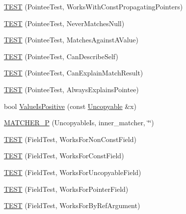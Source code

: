 \begin{DoxyCompactItemize}
\item 
\mbox{\hyperlink{namespacetesting_1_1gmock__matchers__test_a9d851a5bb597fa45b5d1cf3f295398e8}{T\+E\+ST}} (Pointee\+Test, Works\+With\+Const\+Propagating\+Pointers)
\item 
\mbox{\hyperlink{namespacetesting_1_1gmock__matchers__test_ac778a9cebf9306a5efd27cc1186d8269}{T\+E\+ST}} (Pointee\+Test, Never\+Matches\+Null)
\item 
\mbox{\hyperlink{namespacetesting_1_1gmock__matchers__test_afe22e8230dc7a34498e4b2f91dcdd7cd}{T\+E\+ST}} (Pointee\+Test, Matches\+Against\+A\+Value)
\item 
\mbox{\hyperlink{namespacetesting_1_1gmock__matchers__test_ac8b9baa938635d587f0b0df1073208e2}{T\+E\+ST}} (Pointee\+Test, Can\+Describe\+Self)
\item 
\mbox{\hyperlink{namespacetesting_1_1gmock__matchers__test_a263ede06f6b32a625bb40e4f4c58c8dc}{T\+E\+ST}} (Pointee\+Test, Can\+Explain\+Match\+Result)
\item 
\mbox{\hyperlink{namespacetesting_1_1gmock__matchers__test_a00128de027ff6f49f82a7011dd346d43}{T\+E\+ST}} (Pointee\+Test, Always\+Explains\+Pointee)
\item 
bool \mbox{\hyperlink{namespacetesting_1_1gmock__matchers__test_a7c429b4fa8a7835724d9e28033e908b2}{Value\+Is\+Positive}} (const \mbox{\hyperlink{classtesting_1_1gmock__matchers__test_1_1Uncopyable}{Uncopyable}} \&x)
\item 
\mbox{\hyperlink{namespacetesting_1_1gmock__matchers__test_a55a8eba9beb33753baf7690d4cb9cd7e}{M\+A\+T\+C\+H\+E\+R\+\_\+P}} (Uncopyable\+Is, inner\+\_\+matcher, \char`\"{}\char`\"{})
\item 
\mbox{\hyperlink{namespacetesting_1_1gmock__matchers__test_a57213a63527bbd66c024dd1cfafe92d1}{T\+E\+ST}} (Field\+Test, Works\+For\+Non\+Const\+Field)
\item 
\mbox{\hyperlink{namespacetesting_1_1gmock__matchers__test_a065efc397a420d3dde87909b4a9a6285}{T\+E\+ST}} (Field\+Test, Works\+For\+Const\+Field)
\item 
\mbox{\hyperlink{namespacetesting_1_1gmock__matchers__test_ac26d681f09865b0727ca32343d974907}{T\+E\+ST}} (Field\+Test, Works\+For\+Uncopyable\+Field)
\item 
\mbox{\hyperlink{namespacetesting_1_1gmock__matchers__test_a56b1c75b98aaa5c9d3a6dec2d3ba30dc}{T\+E\+ST}} (Field\+Test, Works\+For\+Pointer\+Field)
\item 
\mbox{\hyperlink{namespacetesting_1_1gmock__matchers__test_afcb890c159493e250477408a453b08d1}{T\+E\+ST}} (Field\+Test, Works\+For\+By\+Ref\+Argument)

\end{DoxyCompactItemize}
